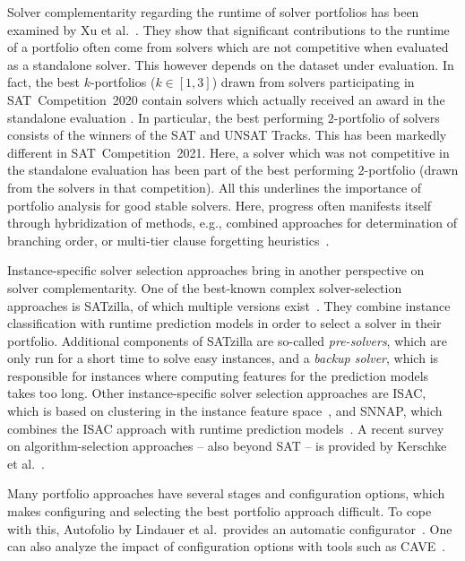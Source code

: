 \documentclass[conference]{IEEEtran}
\begin{document}
Solver complementarity regarding the runtime of solver portfolios has been examined by Xu et al.~\cite{Xu:2012:EvalContribVBS}. 
They show that significant contributions to the runtime of a portfolio often come from solvers which are not competitive when evaluated as a standalone solver. 
This however depends on the dataset under evaluation. 
In fact, the best $k$-portfolios ($k \in [1,3]$) drawn from solvers participating in SAT~Competition~2020 contain solvers which actually received an award in the standalone evaluation \cite{SC2020:AIJ}.
In particular, the best performing $2$-portfolio of solvers consists of the winners of the SAT and UNSAT Tracks. 
This has been markedly different in SAT~Competition~2021.
Here, a solver which was not competitive in the standalone evaluation has been part of the best performing $2$-portfolio (drawn from the solvers in that competition). 
All this underlines the importance of portfolio analysis for good stable solvers. Here, progress often manifests itself through hybridization of methods, e.g., combined approaches for determination of branching order, or multi-tier clause forgetting heuristics~\cite{Oh:2015:satunsat}. 

Instance-specific solver selection approaches bring in another perspective on solver complementarity.
One of the best-known complex solver-selection approaches is SATzilla, of which multiple versions exist~\cite{xu2008satzilla, xu2012satzilla2012}. 
They combine instance classification with runtime prediction models in order to select a solver in their portfolio. 
Additional components of SATzilla are so-called \emph{pre-solvers}, which are only run for a short time to solve easy instances, and a \emph{backup solver}, which is responsible for instances where computing features for the prediction models takes too long.
Other instance-specific solver selection approaches are ISAC, which is based on clustering in the instance feature space~\cite{Kadioglu:2010:ISAC}, and SNNAP, which combines the ISAC approach with runtime prediction models~\cite{Collautti:2013:SNNAP}.
A recent survey on algorithm-selection approaches -- also beyond SAT -- is provided by Kerschke et al.~\cite{kerschke2019automated}.

Many portfolio approaches have several stages and configuration options, which makes configuring and selecting the best portfolio approach difficult.
To cope with this, Autofolio by Lindauer et al.\ provides an automatic configurator~\cite{lindauer2015autofolio}.
One can also analyze the impact of configuration options with tools such as CAVE~\cite{biedenkapp2018cave}.
\end{document}
